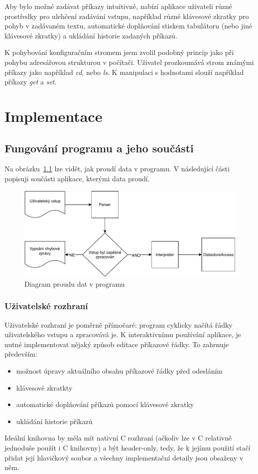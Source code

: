 \documentclass[thesis=B,czech,hidelinks]{FITthesis}[2019/03/06]
\newcommand{\Rplus}{\protect\hspace{-.1em}\protect\raisebox{.35ex}{\smaller{\smaller\textbf{+}}}}
\newcommand{\Cpp}{\mbox{C\Rplus\Rplus}\xspace}
\begin{document}
Aby bylo možné zadávat příkazy intuitivně, nabízí aplikace uživateli různé prostředky pro ulehčení zadávání vstupu, například různé klávesové zkratky pro pohyb v zadávaném textu, automatické doplňování stiskem tabulátoru (nebo jiné klávesové zkratky) a ukládání historie zadaných příkazů.


K pohybování konfiguračním stromem jsem zvolil podobný princip jako při pohybu adresářovou strukturou v počítači. Uživatel prozkoumává strom známými příkazy jako například \textit{cd}, nebo \textit{ls}. K manipulaci s hodnotami slouží například příkazy \textit{get} a \textit{set}.


\chapter{Implementace}

\section{Fungování programu a jeho součásti}
Na obrázku~\ref{proud-dat} lze vidět, jak proudí data v programu. V následující části popisuji součásti aplikace, kterými data proudí.
\begin{figure}
\begin{center}
\includegraphics[width=.9\textwidth]{diagram}
\end{center}
\caption{Diagram proudu dat v programu}\label{proud-dat}
\end{figure}

\subsection{Uživatelské rozhraní}
Uživatelské rozhraní je poměrně přímočaré: program cyklicky načítá řádky uživatelského vstupu a zpracovává je. K interaktivnímu používání aplikace, je nutné implementovat nějaký způsob editace příkazové řádky. To zahrnuje především:
\begin{itemize}
    \item možnost úpravy aktuálního obsahu příkazové řádky před odesláním
    \item klávesové zkratkty 
    \item automatické doplňování příkazů pomocí klávesové zkratky
    \item ukládání historie příkazů
\end{itemize}
Ideální knihovna by měla mít nativní \Cpp{} rozhraní (ačkoliv lze v \Cpp{} relativně jednoduše použít i C knihovny) a být header-only, tedy, že k jejímu použití stačí přidat její hlavičkový soubor a všechny implementační detaily jsou obsaženy v něm.
\end{document}
